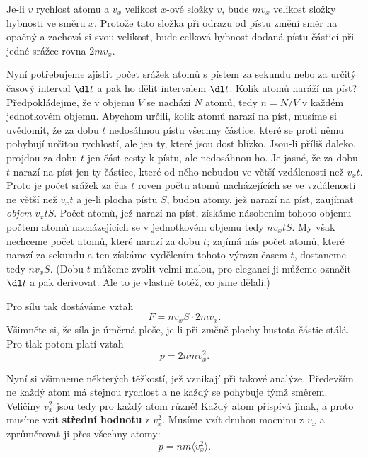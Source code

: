     Je-li \(v\) rychlost atomu a \(v_x\) velikost \(x\)-ové složky \(v\), bude \(mv_x\) velikost
    složky hybnosti ve směru \(x\). Protože tato složka při odrazu od pístu změní směr na opačný a
    zachová si svou velikost, bude celková hybnost dodaná pístu částicí při jedné srážce rovna
    \(2mv_x\).

    Nyní potřebujeme zjistit počet srážek atomů s pístem za sekundu nebo za určitý časový interval
    \(\dl t\) a pak ho dělit intervalem \(\dl t\). Kolik atomů naráží na píst? Předpokládejme, že
    v objemu \(V\) se nachází \(N\) atomů, tedy \(n = N/V\) v každém jednotkovém objemu. Abychom
    určili, kolik atomů narazí na píst, musíme si uvědomit, že za dobu \(t\) nedosáhnou pístu
    všechny částice, které se proti němu pohybují určitou rychlostí, ale jen ty, které jsou dost
    blízko. Jsou-li příliš daleko, projdou za dobu \(t\) jen část cesty k pístu, ale nedosáhnou ho.
    Je jasné, že za dobu \(t\) narazí na píst jen ty částice, které od něho nebudou ve větší
    vzdálenosti než \(v_xt\). Proto je počet srážek za čas \(t\) roven počtu atomů nacházejících se
    ve vzdálenosti ne větší než \(v_xt\) a je-li plocha pístu \(S\), budou atomy, jež narazí na
    píst, zaujímat \emph{objem} \(v_xtS\). Počet atomů, jež narazí na píst, získáme násobením tohoto
    objemu počtem atomů nacházejících se v jednotkovém objemu tedy \(nv_xtS\). My však nechceme
    počet atomů, které narazí za dobu \(t\); zajímá nás počet atomů, které narazí za sekundu a ten
    získáme vydělením tohoto výrazu časem \(t\), dostaneme tedy \(nv_xS\). (Dobu \(t\) můžeme zvolit
    velmi malou, pro eleganci ji můžeme označit \(\dl t\) a pak derivovat. Ale to je vlastně totéž,
    co jsme dělali.)

    Pro sílu tak dostáváme vztah
    \begin{equation}\label{fyz:eq614}
      F=nv_xS\cdot2mv_x.
    \end{equation}
    Všimněte si, že síla je úměrná ploše, je-li při změně plochy hustota částic stálá. Pro tlak
    potom platí vztah
    \begin{equation}\label{fyz:eq615}
      p=2nmv^2_x.
    \end{equation}
   
    Nyní si všimneme některých těžkostí, jež vznikají při takové analýze. Především ne každý atom má
    stejnou rychlost a ne každý se pohybuje týmž směrem. Veličiny \(v_x^2\) jsou tedy pro každý atom
    různé! Každý atom přispívá jinak, a proto musíme vzít \textbf{střední hodnotu} z \(v_x^2\).
    Musíme vzít druhou mocninu z \(v_x\) a zprůměrovat ji přes všechny atomy:
    \begin{equation}\label{fyz:eq616}
      p=nm\langle v^2_x\rangle.
    \end{equation}

